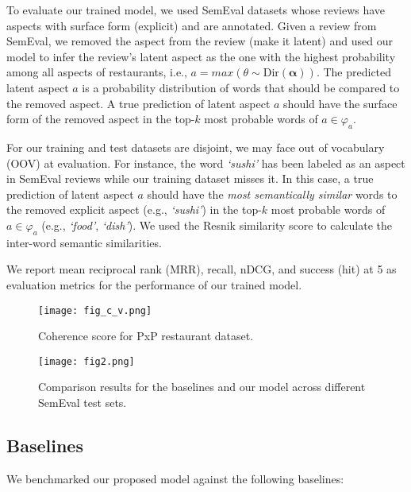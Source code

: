 \documentclass[11pt]{article}
\begin{document}
To evaluate our trained model, we used SemEval datasets whose reviews have aspects with surface form (explicit) and are annotated. Given a review from SemEval, we removed the aspect from the review (make it latent) and used our model to infer the review's latent aspect as the one with the highest probability among all aspects of restaurants, i.e., ${a = max (\theta \sim \text{Dir}(\bm{\alpha}))}$. The predicted latent aspect $a$ is a probability distribution of words that should be compared to the removed aspect. A true prediction of latent aspect $a$ should have the surface form of the removed aspect in the top-${k}$ most probable words of ${a \in \varphi_a}$. 

For our training and test datasets are disjoint, we may face out of vocabulary (OOV) at evaluation. For instance, the word \textit{`sushi'} has been labeled as an aspect in SemEval reviews while our training dataset misses it. In this case, a true prediction of latent aspect $a$ should have the \textit{most semantically similar} words to the removed explicit aspect (e.g., \textit{`sushi'}) in the top-${k}$ most probable words of ${a \in \varphi_a}$ (e.g., \textit{`food'},\textit{ `dish'}). We used the Resnik similarity score \cite{Resnik_1999} to calculate the inter-word semantic similarities. 

We report mean reciprocal rank (MRR), recall,  nDCG,  and success (hit) at 5 as evaluation metrics for the performance of our trained model. 
\begin{figure}
\centering
\texttt{[image: fig\_c\_v.png]}

\caption{Coherence score for PxP restaurant dataset.}
\label{fig:coherence}
\end{figure}









\begin{figure*}[!ht]
\centering
\texttt{[image: fig2.png]}

\caption{Comparison results for the baselines and our model across different SemEval test sets.}
\label{fig:experimet_results}
\end{figure*}
\subsection{Baselines}
We benchmarked our proposed model against the following baselines:
\end{document}
